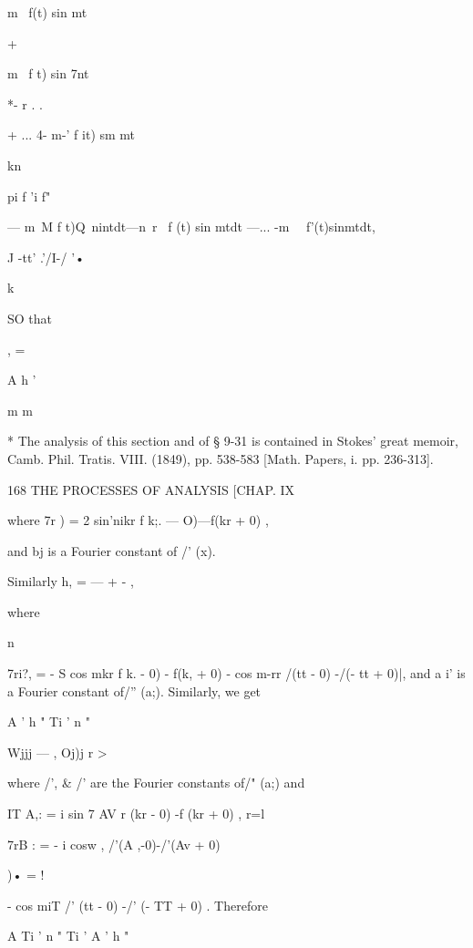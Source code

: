 m~ f(t) sin mt



+



m~ f t) sin 7nt



*- r . .

+ ... 4- m-' f it) sm mt



kn



pi f 'i f"

— m~M f t)Q\ nintdt—n\ r \ f (t) sin mtdt —... -m~ \ f'(t)sinmtdt,

J -tt' .'/I-/ '•



k



SO that



 , =



A h '

m m



* The analysis of this section and of § 9-31 is contained in Stokes'
great memoir, Camb. Phil. Tratis. VIII. (1849), pp. 538-583 [Math.
Papers, i. pp. 236-313].



168 THE PROCESSES OF ANALYSIS [CHAP. IX

where 7r ) = 2 sin'nikr f k;. — O)—f(kr + 0) ,

and bj is a Fourier constant of /' (x).

Similarly h, = — + - ,

where

n

7ri?, = - S cos mkr f k. - 0) - f(k, + 0) - cos m-rr /(tt - 0) -/(- tt
+ 0)|, and a i' is a Fourier constant of/'' (a;). Similarly, we get

A ' h " Ti ' n "

Wjjj — , Oj)j r >

where /', \& /' are the Fourier constants of/" (a;) and

IT A,: = i sin 7 AV r (kr - 0) -f (kr + 0) , r=l

7rB : = - i cosw , /'(A ,-0)-/'(Av + 0)

)• = !

- cos miT /' (tt - 0) -/' (- TT + 0) . Therefore

A Ti ' n " Ti ' A ' h "

